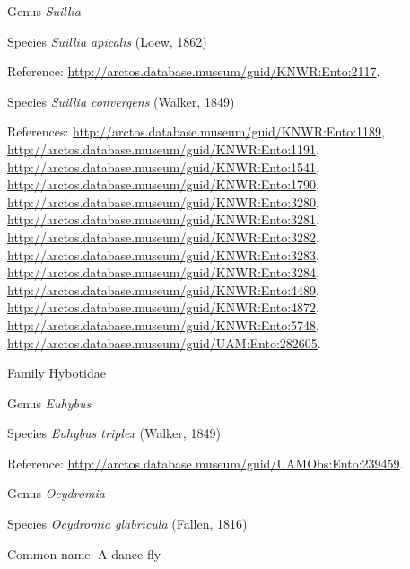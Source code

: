 \documentclass[9pt, article]{memoir}
\begin{document}
\begin{multicols}{2}
\vspace{6pt}\noindent\hspace{30pt}Genus \textit{Suillia}


\vspace{6pt}\noindent\hspace{36pt}Species \textit{Suillia apicalis} (Loew, 1862)


Reference: 
\url{http://arctos.database.museum/guid/KNWR:Ento:2117}.

\vspace{6pt}\noindent\hspace{36pt}Species \textit{Suillia convergens} (Walker, 1849)


References: 
\url{http://arctos.database.museum/guid/KNWR:Ento:1189}, 
\url{http://arctos.database.museum/guid/KNWR:Ento:1191}, 
\url{http://arctos.database.museum/guid/KNWR:Ento:1541}, 
\url{http://arctos.database.museum/guid/KNWR:Ento:1790}, 
\url{http://arctos.database.museum/guid/KNWR:Ento:3280}, 
\url{http://arctos.database.museum/guid/KNWR:Ento:3281}, 
\url{http://arctos.database.museum/guid/KNWR:Ento:3282}, 
\url{http://arctos.database.museum/guid/KNWR:Ento:3283}, 
\url{http://arctos.database.museum/guid/KNWR:Ento:3284}, 
\url{http://arctos.database.museum/guid/KNWR:Ento:4489}, 
\url{http://arctos.database.museum/guid/KNWR:Ento:4872}, 
\url{http://arctos.database.museum/guid/KNWR:Ento:5748}, 
\url{http://arctos.database.museum/guid/UAM:Ento:282605}.

\vspace{6pt}\noindent\hspace{24pt}Family Hybotidae


\vspace{6pt}\noindent\hspace{30pt}Genus \textit{Euhybus}


\vspace{6pt}\noindent\hspace{36pt}Species \textit{Euhybus triplex} (Walker, 1849)


Reference: 
\url{http://arctos.database.museum/guid/UAMObs:Ento:239459}.

\vspace{6pt}\noindent\hspace{30pt}Genus \textit{Ocydromia}


\vspace{6pt}\noindent\hspace{36pt}Species \textit{Ocydromia glabricula} (Fallen, 1816)


Common name: A dance fly


\end{multicols}
\end{document}
